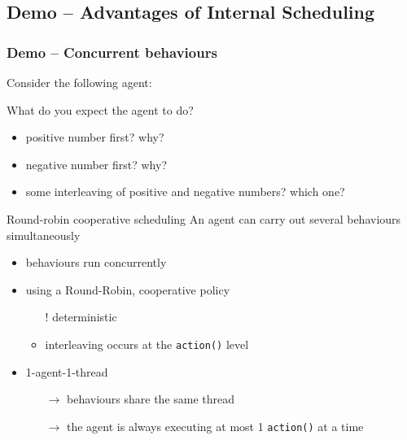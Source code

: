 \documentclass{beamer}\mode<presentation>{\usetheme{AMSCesenaPurpleAndGold}}
\begin{document}
\startDemo

\subsection{Demo \currentDemo{} -- Advantages of Internal Scheduling}

\begin{frame}[allowframebreaks]
    \frametitle{Demo \currentDemo{} -- Concurrent behaviours}

    Consider the following agent:
    

    \bigskip

    What do you expect the agent to do?
    \begin{itemize}
        \item positive number first? why?
        \item negative number first? why?
        \item some \alert{interleaving} of positive and negative numbers? which one?
    \end{itemize}

    \framebreak

    \begin{block}{Round-robin cooperative scheduling}
        An agent can carry out \alert{several} behaviours \alert{simultaneously}
        \begin{itemize}
            \item behaviours run concurrently

            \item using a \alert{Round-Robin}, cooperative policy
            \begin{itemize}
                \item[!] deterministic
                \item interleaving occurs at the \texttt{action()} level
            \end{itemize}

            \item 1-agent-1-thread
            \begin{itemize}
                \item[$\rightarrow$] behaviours share the same thread
                \item[$\rightarrow$] the agent is always executing at most 1 \texttt{action()} at a time
            \end{itemize}
        \end{itemize}
    \end{block}


\end{frame}
\end{document}
